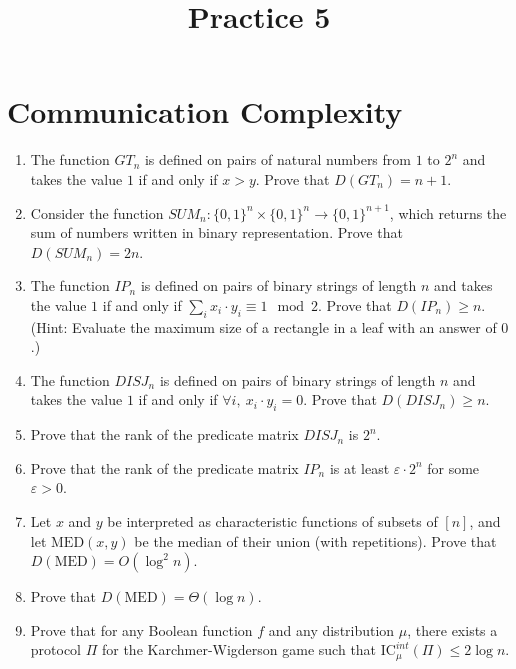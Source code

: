 \documentclass[a4paper,14pt]{extarticle}
\title{Practice 5}
\date{\DTMdate{2027-11-27}}
\author{}
\begin{document}
\maketitle

\section*{Communication Complexity}

\begin{enumerate}
    \item
    The function $GT_n$ is defined on pairs of natural numbers from $1$ to $2^n$ and takes the value $1$ if and only if $x > y$. Prove that $D(GT_n) = n+1$.

    \item
    Consider the function $SUM_n : \{0,1\}^n \times \{0,1\}^n \to \{0,1\}^{n+1}$, which returns the sum of numbers written in binary representation. Prove that $D(SUM_n) = 2n$.

    \item
    The function $IP_n$ is defined on pairs of binary strings of length $n$ and takes the value $1$ if and only if $\sum_i x_i\cdot y_i \equiv 1 \mod 2$. Prove that $D(IP_n) \geq n$.
    (Hint: Evaluate the maximum size of a rectangle in a leaf with an answer of $0$.)

    \item The function $DISJ_n$ is defined on pairs of binary strings of length $n$ and takes the value $1$ if and only if $\forall i,\ x_i\cdot y_i = 0$. Prove that $D(DISJ_n) \geq n$.


    \item
    Prove that the rank of the predicate matrix $DISJ_n$ is $2^n$.

    \item
    Prove that the rank of the predicate matrix $IP_n$ is at least $\varepsilon \cdot 2^n$ for some $\varepsilon > 0$.

    \item
    Let $x$ and $y$ be interpreted as characteristic functions of subsets of $[n]$, and let $\mathrm{MED}(x, y)$ be the median of their union (with repetitions).
    Prove that $D(\mathrm{MED}) = O(\log^2{n})$.

    \item
    Prove that $D(\mathrm{MED}) = \Theta(\log{n})$.


        \item
        Prove that for any Boolean function $f$ and any distribution $\mu$, there exists a protocol $\Pi$ for the Karchmer-Wigderson game such that $\mathrm{IC}^{int}_\mu(\Pi) \leq 2\log n$.


\end{enumerate}
\end{document}
